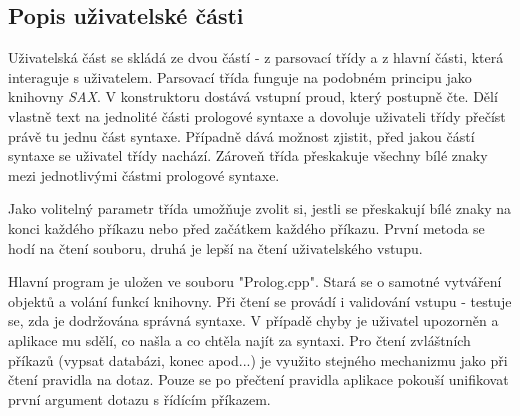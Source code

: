 \documentclass[12pt,a4paper,titlepage]{scrartcl}
\begin{document}
	\subsection{Popis uživatelské části}
	Uživatelská část se skládá ze dvou částí - z parsovací třídy a z hlavní části, která interaguje s uživatelem. Parsovací třída funguje na podobném principu jako knihovny \textit{SAX}. V konstruktoru dostává vstupní proud, který postupně čte. Dělí vlastně text na jednolité části prologové syntaxe a dovoluje uživateli třídy přečíst právě tu jednu část syntaxe. Případně dává možnost zjistit, před jakou částí syntaxe se uživatel třídy nachází. Zároveň třída přeskakuje všechny bílé znaky mezi jednotlivými částmi prologové syntaxe.
	\par
	Jako volitelný parametr třída umožňuje zvolit si, jestli se přeskakují bílé znaky na konci každého příkazu nebo před začátkem každého příkazu. První metoda se hodí na čtení souboru, druhá je lepší na čtení uživatelského vstupu.
	\par
	Hlavní program je uložen ve souboru "Prolog.cpp". Stará se o samotné vytváření objektů a volání funkcí knihovny. Při čtení se provádí i validování vstupu - testuje se, zda je dodržována správná syntaxe. V případě chyby je uživatel upozorněn a aplikace mu sdělí, co našla a co chtěla najít za syntaxi. Pro čtení zvláštních příkazů (vypsat databázi, konec apod...) je využito stejného mechanizmu jako při čtení pravidla na dotaz. Pouze se po přečtení pravidla aplikace pokouší unifikovat první argument dotazu s řídícím příkazem.
\end{document}
